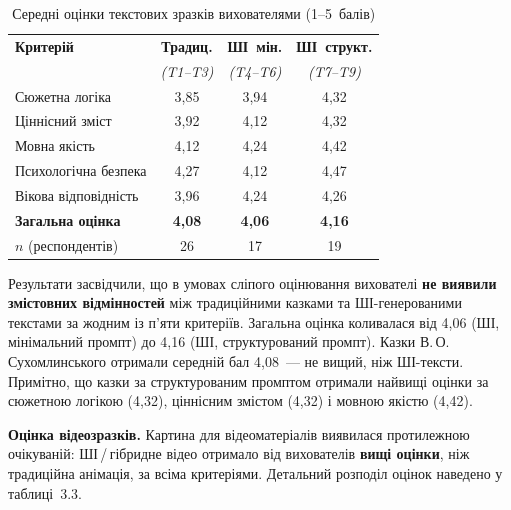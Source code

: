 \documentclass[14pt, a4paper]{extreport}
\begin{document}
\begin{table}[htbp]
\caption{Середні оцінки текстових зразків вихователями (1--5~балів)}
\centering
\begin{tabular}{|l|c|c|c|}
\hline
\rowcolor{tblhead}\textbf{Критерій} & \textbf{Традиц.} & \textbf{ШІ~мін.} & \textbf{ШІ~структ.} \\
\rowcolor{tblhead} & \textit{(T1--T3)} & \textit{(T4--T6)} & \textit{(T7--T9)} \\
\hline
Сюжетна логіка         & 3{,}85 & 3{,}94 & 4{,}32 \\
Ціннісний зміст         & 3{,}92 & 4{,}12 & 4{,}32 \\
Мовна якість            & 4{,}12 & 4{,}24 & 4{,}42 \\
Психологічна безпека    & 4{,}27 & 4{,}12 & 4{,}47 \\
Вікова відповідність    & 3{,}96 & 4{,}24 & 4{,}26 \\
\textbf{Загальна оцінка} & \textbf{4{,}08} & \textbf{4{,}06} & \textbf{4{,}16} \\
\hline
$n$ (респондентів) & 26 & 17 & 19 \\
\hline
\end{tabular}
\end{table}

Результати засвідчили, що в умовах сліпого оцінювання вихователі \textbf{не виявили змістовних відмінностей} між традиційними казками та ШІ-генерованими текстами за жодним із п'яти критеріїв. Загальна оцінка коливалася від 4{,}06 (ШІ, мінімальний промпт) до 4{,}16 (ШІ, структурований промпт). Казки В.\,О.\,Сухомлинського отримали середній бал 4{,}08~--- не вищий, ніж ШІ-тексти. Примітно, що казки за структурованим промптом отримали найвищі оцінки за сюжетною логікою (4{,}32), ціннісним змістом (4{,}32) і мовною якістю (4{,}42).

\textbf{Оцінка відеозразків.} Картина для відеоматеріалів виявилася протилежною очікуваній: ШІ\,/\,гібридне відео отримало від вихователів \textbf{вищі оцінки}, ніж традиційна анімація, за всіма критеріями. Детальний розподіл оцінок наведено у таблиці~3.3.
\end{document}
